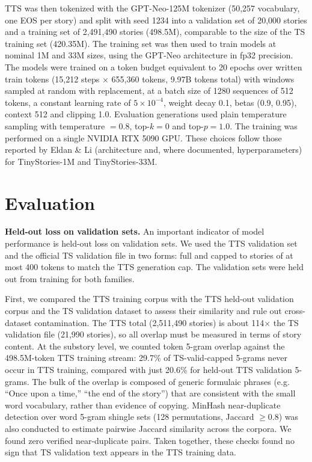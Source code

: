 \documentclass{article}
\begin{document}
TTS was then tokenized with the GPT-Neo-125M tokenizer (50,257 vocabulary, one EOS per story) and split with seed 1234 into a validation set of 20,000 stories and a training set of 2,491,490 stories (498.5M), comparable to the size of the TS training set (420.35M). The training set was then used to train models at nominal 1M and 33M sizes, using the GPT-Neo architecture in fp32 precision. The models were trained on a token budget equivalent to 20 epochs over written train tokens (15,212 steps $\times$ 655,360 tokens, 9.97B tokens total) with windows sampled at random with replacement, at a batch size of 1280 sequences of 512 tokens, a constant learning rate of $5\times10^{-4}$, weight decay 0.1, betas (0.9, 0.95), context 512 and clipping 1.0. Evaluation generations used plain temperature sampling with temperature $=0.8$, top-$k=0$ and top-$p=1.0$. The training was performed on a single NVIDIA RTX 5090 GPU. These choices follow those reported by Eldan \& Li (architecture and, where documented, hyperparameters) for TinyStories-1M and TinyStories-33M.

\section{Evaluation}
\textbf{Held-out loss on validation sets.} An important indicator of model performance is held-out loss on validation sets. We used the TTS validation set and the official TS validation file in two forms: full and capped to stories of at most 400 tokens to match the TTS generation cap. The validation sets were held out from training for both families.

First, we compared the TTS training corpus with the TTS held-out validation corpus and the TS validation dataset to assess their similarity and rule out cross-dataset contamination. The TTS total (2,511,490 stories) is about 114$\times$ the TS validation file (21,990 stories), so all overlap must be measured in terms of story content. At the substory level, we counted token 5-gram overlap against the 498.5M-token TTS training stream: 29.7\% of TS-valid-capped 5-grams never occur in TTS training, compared with just 20.6\% for held-out TTS validation 5-grams. The bulk of the overlap is composed of generic formulaic phrases (e.g. ``Once upon a time,'' ``the end of the story'') that are consistent with the small word vocabulary, rather than evidence of copying. MinHash near-duplicate detection over word 5-gram shingle sets (128 permutations, Jaccard $\ge 0.8$) was also conducted to estimate pairwise Jaccard similarity across the corpora. We found zero verified near-duplicate pairs. Taken together, these checks found no sign that TS validation text appears in the TTS training data.
\end{document}
